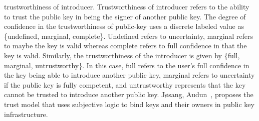 trustworthiness of introducer. Trustworthiness of introducer refers to the
ability to trust the public key in being the signer of another public key. The
degree of confidence in the trustworthiness of public-key uses a discrete
labeled value as \{undefined, marginal, complete\}. Undefined refers to
uncertainty, marginal refers to maybe the key is valid whereas complete refers
to full confidence in that the key is valid. Similarly, the trustworthiness of
the introducer is given by \{full, marginal, untrustworthy\}. In this case, full
refers to the user's full confidence in the key being able to introduce another
public key, marginal refers to uncertainty if the public key is fully
competent, and untrustworthy represents that the key cannot be trusted to
introduce another public key. Jøsang, Audun~\cite{josang1999algebra}, proposes
the trust model that uses subjective logic to bind keys and their owners in
public key infrastructure. 

